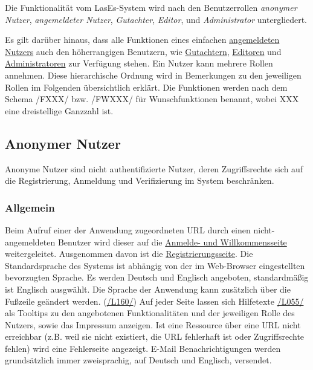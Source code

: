
Die Funktionalität vom LasEs-System wird nach den Benutzerrollen
\textit{anonymer Nutzer}, \textit{angemeldeter Nutzer}, \textit{Gutachter}, \textit{Editor}, und
\textit{Administrator} untergliedert.

Es gilt darüber hinaus, dass alle Funktionen eines einfachen \hyperref[mkrit:angemeldet]{angemeldeten Nutzers} auch den höherrangigen Benutzern, wie
\hyperref[mkrit:gutachter]{Gutachtern}, \hyperref[mkrit:editor]{Editoren} und \hyperref[mkrit:admin]{Administratoren} zur Verfügung stehen.
Ein Nutzer kann mehrere Rollen annehmen. Diese hierarchische Ordnung wird in Bemerkungen zu den jeweiligen Rollen im Folgenden
übersichtlich erklärt.
Die Funktionen werden nach dem Schema /FXXX/ bzw. /FWXXX/ für Wunschfunktionen benannt, wobei XXX eine dreistellige Ganzzahl ist.

\subsection{Anonymer Nutzer}\label{funkt:nutzer}
Anonyme Nutzer sind nicht authentifizierte Nutzer, deren Zugriffsrechte sich
auf die Registrierung, Anmeldung und Verifizierung im System beschränken.

\subsubsection{Allgemein}
\begin{description}
     Beim Aufruf einer der Anwendung zugeordneten URL durch einen nicht-angemeldeten Benutzer
    wird dieser auf die \hyperref[an:log]{Anmelde- und Willkommensseite} weitergeleitet. Ausgenommen davon ist die \hyperref[an:reg]{Registrierungsseite}.
     Die Standardsprache des Systems ist abhängig von der im Web-Browser
    eingestellten bevorzugten Sprache. Es werden Deutsch und Englisch angeboten, standardmäßig ist Englisch ausgwählt.
    Die Sprache der Anwendung kann zusätzlich über die Fußzeile geändert werden. (\hyperref[leist:160]{/L160/})
     Auf jeder Seite lassen sich
    Hilfetexte \hyperref[leist:055]{/L055/} als Tooltips zu den angebotenen Funktionalitäten und der jeweiligen Rolle
    des Nutzers, sowie das Impressum anzeigen.
     Ist eine Ressource über eine URL nicht erreichbar (z.B. weil sie nicht existiert,
     die URL fehlerhaft ist oder Zugriffsrechte fehlen) wird eine Fehlerseite angezeigt.
     E-Mail Benachrichtigungen werden grundsätzlich immer zweisprachig,
    auf Deutsch und Englisch, versendet.
\end{description}

